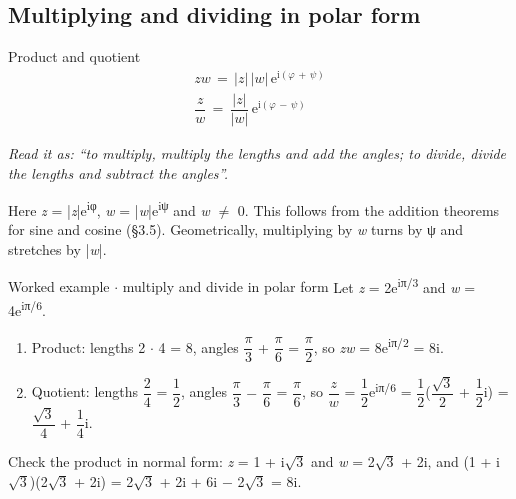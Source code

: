 \documentclass[11pt]{article}
\begin{document}
\begin{keepsection}
\begin{keepsection}
\subsection{Multiplying and dividing in polar form}

\begin{equationcard}{Product and quotient}
\[ \begin{gathered} {z}{w}\, =\, |{z}|\, |{w}|\, \mathrm{e}^{\mathrm{i}(φ\, +\, ψ)} \\ \dfrac{{z}}{{w}}\, =\, \dfrac{|{z}|}{|{w}|}\, \mathrm{e}^{\mathrm{i}(φ\, -\, ψ)} \end{gathered} \]
{\small \emph{Read it as: “to multiply, multiply the lengths and add the angles; to divide, divide the lengths and subtract the angles”.}\par Here \textit{z} = |\textit{z}|e\textsuperscript{iφ}, \textit{w} = |\textit{w}|e\textsuperscript{iψ} and \textit{w} \ensuremath{\neq} 0. This follows from the addition theorems for sine and cosine (§3.5). Geometrically, multiplying by \textit{w} turns by ψ and stretches by |\textit{w}|.}
\end{equationcard}

\begin{workedbox}{Worked example \ensuremath{\cdot} multiply and divide in polar form}
Let \textit{z} = 2e\textsuperscript{iπ/3} and \textit{w} = 4e\textsuperscript{iπ/6}.

\begin{enumerate}
\item Product: lengths 2 \ensuremath{\cdot} 4 = 8, angles {\small\ensuremath{\dfrac{π}{3}}} + {\small\ensuremath{\dfrac{π}{6}}} = {\small\ensuremath{\dfrac{π}{2}}}, so \textit{z}\textit{w} = 8e\textsuperscript{iπ/2} = 8i.
\item Quotient: lengths {\small\ensuremath{\dfrac{2}{4}}} = {\small\ensuremath{\dfrac{1}{2}}}, angles {\small\ensuremath{\dfrac{π}{3}}} \ensuremath{-} {\small\ensuremath{\dfrac{π}{6}}} = {\small\ensuremath{\dfrac{π}{6}}}, so {\small\ensuremath{\dfrac{{z}}{{w}}}} = {\small\ensuremath{\dfrac{1}{2}}}e\textsuperscript{iπ/6} = {\small\ensuremath{\dfrac{1}{2}}}({\small\ensuremath{\dfrac{\sqrt{3}}{2}}} + {\small\ensuremath{\dfrac{1}{2}}}i) = {\small\ensuremath{\dfrac{\sqrt{3}}{4}}} + {\small\ensuremath{\dfrac{1}{4}}}i.
\end{enumerate}

Check the product in normal form: \textit{z} = 1 + i\ensuremath{\sqrt{3}} and \textit{w} = 2\ensuremath{\sqrt{3}} + 2i, and (1 + i\ensuremath{\sqrt{3}})(2\ensuremath{\sqrt{3}} + 2i) = 2\ensuremath{\sqrt{3}} + 2i + 6i \ensuremath{-} 2\ensuremath{\sqrt{3}} = 8i.
\end{workedbox}


\end{keepsection}
\end{keepsection}
\end{document}

